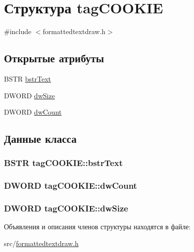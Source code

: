 \hypertarget{structtag_c_o_o_k_i_e}{\section{Структура tag\-C\-O\-O\-K\-I\-E}
\label{structtag_c_o_o_k_i_e}
}


{\ttfamily \#include $<$formattedtextdraw.\-h$>$}

\subsection*{Открытые атрибуты}
\begin{DoxyCompactItemize}
\item 
B\-S\-T\-R \hyperlink{structtag_c_o_o_k_i_e_a073cde0733e715713f502fc437acb043}{bstr\-Text}
\item 
D\-W\-O\-R\-D \hyperlink{structtag_c_o_o_k_i_e_aca6f0d6c1300f2aa0bc3ba9fbf27c5aa}{dw\-Size}
\item 
D\-W\-O\-R\-D \hyperlink{structtag_c_o_o_k_i_e_a3391326801633c7405a797dc91613724}{dw\-Count}
\end{DoxyCompactItemize}


\subsection{Данные класса}
\hypertarget{structtag_c_o_o_k_i_e_a073cde0733e715713f502fc437acb043}{
\subsubsection[{bstr\-Text}]{\setlength{\rightskip}{0pt plus 5cm}B\-S\-T\-R tag\-C\-O\-O\-K\-I\-E\-::bstr\-Text}}\label{structtag_c_o_o_k_i_e_a073cde0733e715713f502fc437acb043}
\hypertarget{structtag_c_o_o_k_i_e_a3391326801633c7405a797dc91613724}{
\subsubsection[{dw\-Count}]{\setlength{\rightskip}{0pt plus 5cm}D\-W\-O\-R\-D tag\-C\-O\-O\-K\-I\-E\-::dw\-Count}}\label{structtag_c_o_o_k_i_e_a3391326801633c7405a797dc91613724}
\hypertarget{structtag_c_o_o_k_i_e_aca6f0d6c1300f2aa0bc3ba9fbf27c5aa}{
\subsubsection[{dw\-Size}]{\setlength{\rightskip}{0pt plus 5cm}D\-W\-O\-R\-D tag\-C\-O\-O\-K\-I\-E\-::dw\-Size}}\label{structtag_c_o_o_k_i_e_aca6f0d6c1300f2aa0bc3ba9fbf27c5aa}


Объявления и описания членов структуры находятся в файле\-:\begin{DoxyCompactItemize}
\item 
src/\hyperlink{formattedtextdraw_8h}{formattedtextdraw.\-h}\end{DoxyCompactItemize}
